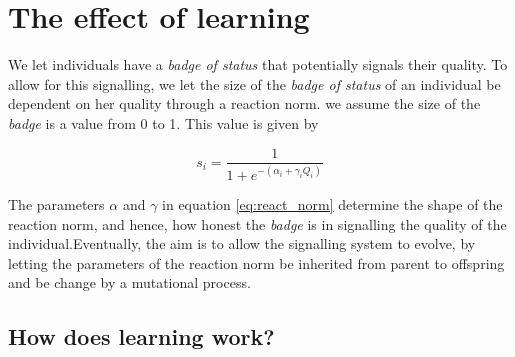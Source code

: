 \documentclass[]{article}
\begin{document}
\section{The effect of learning}\label{the-effect-of-learning}

We let individuals have a \emph{badge of status} that potentially
signals their quality. To allow for this signalling, we let the size of
the \emph{badge of status} of an individual be dependent on her quality
through a reaction norm. we assume the size of the \emph{badge} is a
value from 0 to 1. This value is given by

\begin{equation}
s_i = \frac{1}{1+e^{-(\alpha_i+\gamma_iQ_i)}}
\label{eq:react_norm}
\end{equation}

The parameters \(\alpha\) and \(\gamma\) in equation \ref{eq:react_norm}
determine the shape of the reaction norm, and hence, how honest the
\emph{badge} is in signalling the quality of the individual.Eventually,
the aim is to allow the signalling system to evolve, by letting the
parameters of the reaction norm be inherited from parent to offspring
and be change by a mutational process.

\subsection{How does learning work?}\label{how-does-learning-work}
\end{document}
